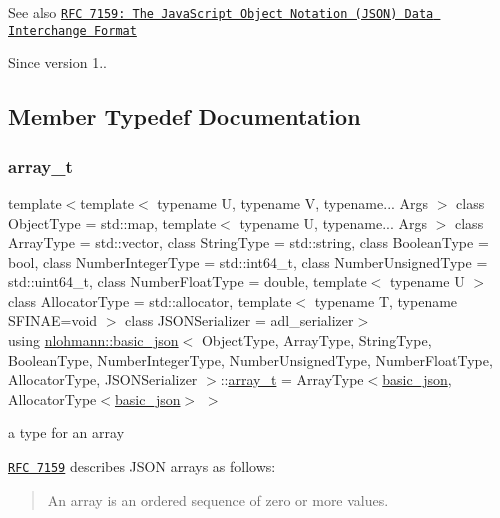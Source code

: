 \begin{DoxySeeAlso}{See also}
\href{http://rfc7159.net/rfc7159}{\tt R\+FC 7159\+: The Java\+Script Object Notation (J\+S\+ON) Data Interchange Format}
\end{DoxySeeAlso}
\begin{DoxySince}{Since}
version 1.. 
\end{DoxySince}


\subsection{Member Typedef Documentation}
\mbox{\label{classnlohmann_1_1basic__json_ae095578e03df97c5b3991787f1056374}} 
\subsubsection{\texorpdfstring{array\+\_\+t}{array\_t}}
{\footnotesize\ttfamily template$<$template$<$ typename U, typename V, typename... Args $>$ class Object\+Type = std\+::map, template$<$ typename U, typename... Args $>$ class Array\+Type = std\+::vector, class String\+Type  = std\+::string, class Boolean\+Type  = bool, class Number\+Integer\+Type  = std\+::int64\+\_\+t, class Number\+Unsigned\+Type  = std\+::uint64\+\_\+t, class Number\+Float\+Type  = double, template$<$ typename U $>$ class Allocator\+Type = std\+::allocator, template$<$ typename T, typename S\+F\+I\+N\+A\+E=void $>$ class J\+S\+O\+N\+Serializer = adl\+\_\+serializer$>$ \\
using \mbox{\hyperlink{classnlohmann_1_1basic__json}{nlohmann\+::basic\+\_\+json}}$<$ Object\+Type, Array\+Type, String\+Type, Boolean\+Type, Number\+Integer\+Type, Number\+Unsigned\+Type, Number\+Float\+Type, Allocator\+Type, J\+S\+O\+N\+Serializer $>$\+::\mbox{\hyperlink{classnlohmann_1_1basic__json_ae095578e03df97c5b3991787f1056374}{array\+\_\+t}} =  Array\+Type$<$\mbox{\hyperlink{classnlohmann_1_1basic__json}{basic\+\_\+json}}, Allocator\+Type$<$\mbox{\hyperlink{classnlohmann_1_1basic__json}{basic\+\_\+json}}$>$ $>$}



a type for an array 

\href{http://rfc7159.net/rfc7159}{\tt R\+FC 7159} describes J\+S\+ON arrays as follows\+: \begin{quote}
An array is an ordered sequence of zero or more values. \end{quote}


